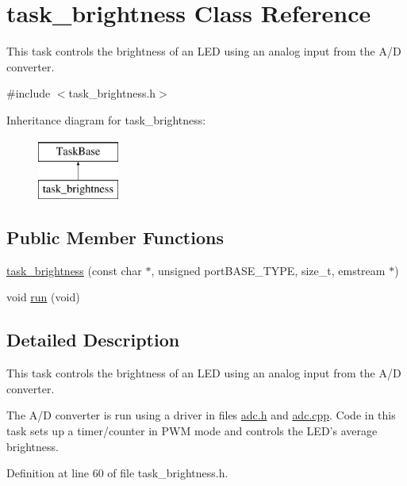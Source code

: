 \hypertarget{classtask__brightness}{\section{task\-\_\-brightness Class Reference}
\label{classtask__brightness}
}


This task controls the brightness of an L\-E\-D using an analog input from the A/\-D converter.  




{\ttfamily \#include $<$task\-\_\-brightness.\-h$>$}

Inheritance diagram for task\-\_\-brightness\-:\begin{figure}[H]
\begin{center}
\leavevmode
\includegraphics[height=2.000000cm]{classtask__brightness}
\end{center}
\end{figure}
\subsection*{Public Member Functions}
\begin{DoxyCompactItemize}
\item 
\hyperlink{classtask__brightness_a5802baf3a0c9fe53ccbce8966d1fad47}{task\-\_\-brightness} (const char $\ast$, unsigned port\-B\-A\-S\-E\-\_\-\-T\-Y\-P\-E, size\-\_\-t, emstream $\ast$)
\item 
void \hyperlink{classtask__brightness_a615beac07a99f0856f048a46fd9a3898}{run} (void)
\end{DoxyCompactItemize}


\subsection{Detailed Description}
This task controls the brightness of an L\-E\-D using an analog input from the A/\-D converter. 

The A/\-D converter is run using a driver in files {\ttfamily \hyperlink{adc_8h}{adc.\-h}} and {\ttfamily \hyperlink{adc_8cpp}{adc.\-cpp}}. Code in this task sets up a timer/counter in P\-W\-M mode and controls the L\-E\-D's average brightness. 

Definition at line 60 of file task\-\_\-brightness.\-h.



